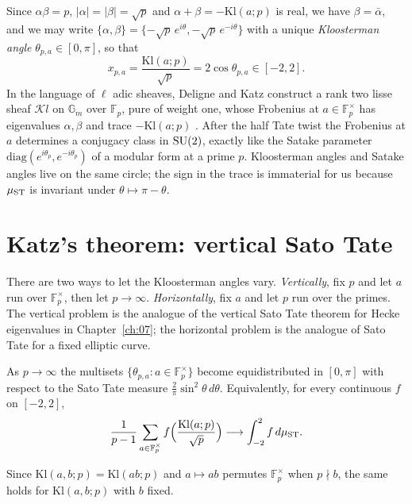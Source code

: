 Since $\alpha\beta=p$, $|\alpha|=|\beta|=\sqrt p$ and $\alpha+\beta=-\mathrm{Kl}(a;p)$ is real, we have $\beta=\bar\alpha$, and we may write $\{\alpha,\beta\}=\{-\sqrt p\,e^{i\theta},-\sqrt p\,e^{-i\theta}\}$ with a unique \emph{Kloosterman angle} $\theta_{p,a}\in[0,\pi]$, so that
\[
x_{p,a}=\frac{\mathrm{Kl}(a;p)}{\sqrt p}=2\cos\theta_{p,a}\in[-2,2].
\]
In the language of $\ell$ adic sheaves, Deligne and Katz construct a rank two lisse sheaf $\mathcal{K}l$ on $\mathbb{G}_m$ over $\mathbb{F}_p$, pure of weight one, whose Frobenius at $a\in\mathbb{F}_p^\times$ has eigenvalues $\alpha,\beta$ and trace $-\mathrm{Kl}(a;p)$ \cite{katz1988}. After the half Tate twist the Frobenius at $a$ determines a conjugacy class in $\mathrm{SU}(2)$, exactly like the Satake parameter $\mathrm{diag}(e^{i\theta_p},e^{-i\theta_p})$ of a modular form at a prime $p$. Kloosterman angles and Satake angles live on the same circle; the sign in the trace is immaterial for us because $\mu_{\mathrm{ST}}$ is invariant under $\theta\mapsto\pi-\theta$.

\section{Katz's theorem: vertical Sato Tate}\label{sec:06bkatz}

There are two ways to let the Kloosterman angles vary. \emph{Vertically}, fix $p$ and let $a$ run over $\mathbb{F}_p^\times$, then let $p\to\infty$. \emph{Horizontally}, fix $a$ and let $p$ run over the primes. The vertical problem is the analogue of the vertical Sato Tate theorem for Hecke eigenvalues in Chapter~\ref{ch:07}; the horizontal problem is the analogue of Sato Tate for a fixed elliptic curve.

\begin{theorem}\label{thm:06bkatz}
As $p\to\infty$ the multisets $\{\theta_{p,a}:a\in\mathbb{F}_p^\times\}$ become equidistributed in $[0,\pi]$ with respect to the Sato Tate measure $\frac2\pi\sin^2\theta\,d\theta$. Equivalently, for every continuous $f$ on $[-2,2]$,
\[
\frac{1}{p-1}\sum_{a\in\mathbb{F}_p^\times}f\Bigl(\frac{\mathrm{Kl}(a;p)}{\sqrt p}\Bigr)\longrightarrow\int_{-2}^2f\,d\mu_{\mathrm{ST}} .
\]
\end{theorem}

Since $\mathrm{Kl}(a,b;p)=\mathrm{Kl}(ab;p)$ and $a\mapsto ab$ permutes $\mathbb{F}_p^\times$ when $p\nmid b$, the same holds for $\mathrm{Kl}(a,b;p)$ with $b$ fixed.

